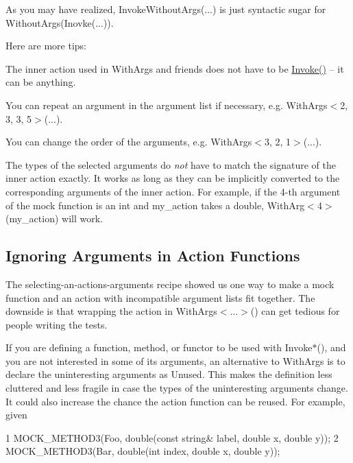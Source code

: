 As you may have realized, {\ttfamily Invoke\+Without\+Args(...)} is just syntactic sugar for {\ttfamily Without\+Args(Inovke(...))}.

Here are more tips\+:


\begin{DoxyItemize}
\item The inner action used in {\ttfamily With\+Args} and friends does not have to be {\ttfamily \hyperlink{namespacetesting_a12aebaf8363d49a383047529f798b694}{Invoke()}} -- it can be anything.
\item You can repeat an argument in the argument list if necessary, e.\+g. {\ttfamily With\+Args$<$2, 3, 3, 5$>$(...)}.
\item You can change the order of the arguments, e.\+g. {\ttfamily With\+Args$<$3, 2, 1$>$(...)}.
\item The types of the selected arguments do {\itshape not} have to match the signature of the inner action exactly. It works as long as they can be implicitly converted to the corresponding arguments of the inner action. For example, if the 4-\/th argument of the mock function is an {\ttfamily int} and {\ttfamily my\+\_\+action} takes a {\ttfamily double}, {\ttfamily With\+Arg$<$4$>$(my\+\_\+action)} will work.
\end{DoxyItemize}

\subsection*{Ignoring Arguments in Action Functions}

The selecting-\/an-\/action\textquotesingle{}s-\/arguments recipe showed us one way to make a mock function and an action with incompatible argument lists fit together. The downside is that wrapping the action in {\ttfamily With\+Args$<$...$>$()} can get tedious for people writing the tests.

If you are defining a function, method, or functor to be used with {\ttfamily Invoke$\ast$()}, and you are not interested in some of its arguments, an alternative to {\ttfamily With\+Args} is to declare the uninteresting arguments as {\ttfamily Unused}. This makes the definition less cluttered and less fragile in case the types of the uninteresting arguments change. It could also increase the chance the action function can be reused. For example, given


\begin{DoxyCode}
1 MOCK\_METHOD3(Foo, double(const string& label, double x, double y));
2 MOCK\_METHOD3(Bar, double(int index, double x, double y));
\end{DoxyCode}



